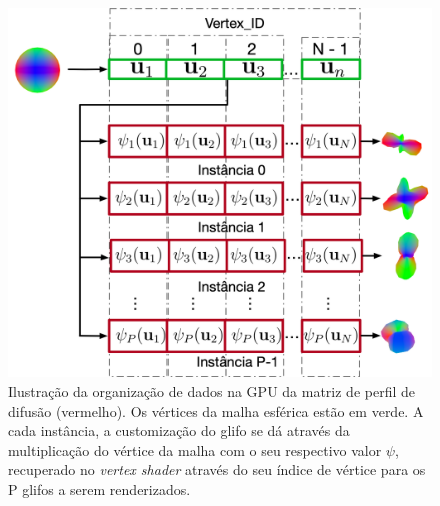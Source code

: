 \documentclass[
    12pt,                %
    oneside,            %
    a4paper,            %
    english,            %
    french,                %
    spanish,            %
    brazil                %
    ]{abntex2}
\begin{document}
\begin{figure}[h]
    \centering
    \includegraphics[width=.8\linewidth, angle=0]{figs/Esquema_Glifo/GPU2GlifoGeneral.png}
    \caption{Ilustração da organização de dados na GPU da matriz de perfil de difusão (vermelho). Os vértices da malha esférica estão em verde. A cada instância, a customização do glifo se dá através da multiplicação do vértice da malha com o seu respectivo valor $\psi$, recuperado no \textit{vertex shader} através do seu índice de vértice para os P glifos a serem renderizados.}
    \label{fig::GPU2glifoGeneral}
   \hspace{1pt}
\end{figure}



\end{document}
